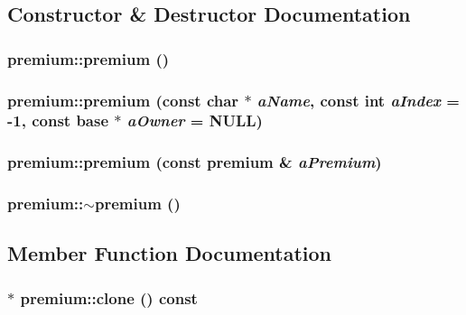 \subsection{Constructor \& Destructor Documentation}
\hypertarget{classpremium_ac3dd91ab23baa3f55dea02cbb3bb28cd}{
\subsubsection[{premium}]{\setlength{\rightskip}{0pt plus 5cm}premium::premium ()}}
\label{classpremium_ac3dd91ab23baa3f55dea02cbb3bb28cd}
\hypertarget{classpremium_a93afafdf2e443abb3375bb079a3791c8}{
\subsubsection[{premium}]{\setlength{\rightskip}{0pt plus 5cm}premium::premium (const char $\ast$ {\em aName}, \/  const int {\em aIndex} = {\ttfamily -\/1}, \/  const {\bf base} $\ast$ {\em aOwner} = {\ttfamily NULL})}}
\label{classpremium_a93afafdf2e443abb3375bb079a3791c8}
\hypertarget{classpremium_a176e90d12b69d5ba258150b1acfacac4}{
\subsubsection[{premium}]{\setlength{\rightskip}{0pt plus 5cm}premium::premium (const {\bf premium} \& {\em aPremium})}}
\label{classpremium_a176e90d12b69d5ba258150b1acfacac4}
\hypertarget{classpremium_a09d27da0eddb03586f656c560545a15e}{
\subsubsection[{$\sim$premium}]{\setlength{\rightskip}{0pt plus 5cm}premium::$\sim$premium ()}}
\label{classpremium_a09d27da0eddb03586f656c560545a15e}


\subsection{Member Function Documentation}
\hypertarget{classpremium_aa8167e20347089e9037fcba95f4fe435}{
\subsubsection[{clone}]{ $\ast$ premium::clone () const}}
\label{classpremium_aa8167e20347089e9037fcba95f4fe435}


